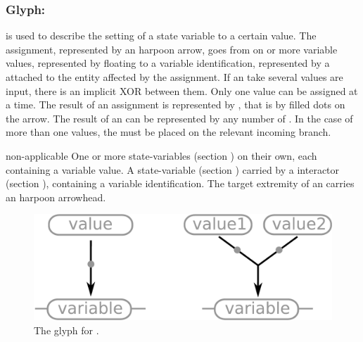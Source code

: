 
\subsubsection{Glyph: }\label{sec:assignment}

 is used to describe the setting of a state variable to a certain value. The assignment, represented by an harpoon arrow, goes from on or more variable values, represented by floating  to a variable identification, represented by a  attached to the entity affected by the assignment.   If an  take several  values are input, there is an implicit XOR between them. Only one value can be assigned at a time. The result of an assignment is represented by , that is by filled dots on the arrow. The result of an  can be represented by any number of . In the case of more than one  values, the  must be placed on the relevant incoming branch.

\begin{glyphDescription}
 \glyphSboTerm non-applicable
 \glyphOrigin One or more state-variables (section ) on their own, each containing a variable value.
 \glyphTarget A state-variable (section ) carried by a interactor (section ), containing a variable identification.
 \glyphEndPoint The target extremity of an  carries an harpoon arrowhead.
 \end{glyphDescription}

\begin{figure}[H]
  \centering
  \includegraphics[scale = 0.3]{images/assignment}
  \caption{The \ER glyph for .}
  \label{fig:assignment}
\end{figure}

